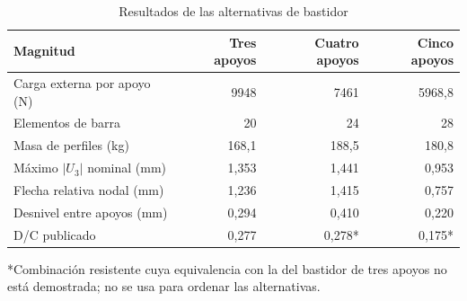 \begin{table}[htbp]
\centering\small\singlespacing
\caption{Resultados de las alternativas de bastidor}
\label{tab:comparacion-apoyos}
\begin{tabular}{lrrr}
\toprule
\textbf{Magnitud} & \textbf{Tres apoyos} & \textbf{Cuatro apoyos} & \textbf{Cinco apoyos}\\
\midrule
Carga externa por apoyo (N) & 9948 & 7461 & 5968,8\\
Elementos de barra & 20 & 24 & 28\\
Masa de perfiles (kg) & 168,1 & 188,5 & 180,8\\
Máximo $|U_3|$ nominal (mm) & 1,353 & 1,441 & 0,953\\
Flecha relativa nodal (mm) & 1,236 & 1,415 & 0,757\\
Desnivel entre apoyos (mm) & 0,294 & 0,410 & 0,220\\
D/C publicado & 0,277 & 0,278* & 0,175*\\
\bottomrule
\end{tabular}
\par\smallskip\footnotesize
*Combinación resistente cuya equivalencia con la del bastidor de tres apoyos no está demostrada; no se usa para ordenar las alternativas.
\end{table}
